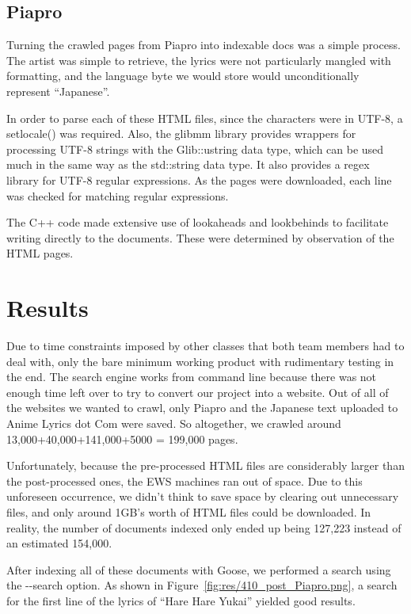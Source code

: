 \documentclass{acm} %
\begin{document}
\begin{CJK}{UTF8}{zhsong}
\subsection{Piapro}

Turning the crawled pages from Piapro into indexable docs was a simple process. The artist was simple to retrieve, the lyrics were not particularly mangled with formatting, and the language byte we would store would unconditionally represent ``Japanese''.

In order to parse each of these HTML files, since the characters were in UTF-8, a setlocale() was required. Also, the glibmm library provides wrappers for processing UTF-8 strings with the Glib::ustring data type, which can be used much in the same way as the std::string data type. It also provides a regex library for UTF-8 regular expressions. As the pages were downloaded, each line was checked for matching regular expressions.

The C++ code made extensive use of lookaheads and lookbehinds to facilitate writing directly to the documents. These were determined by observation of the HTML pages.

\section{Results}

Due to time constraints imposed by other classes that both team members had to deal with, only the bare minimum working product with rudimentary testing in the end. The search engine works from command line because there was not enough time left over to try to convert our project into a website. Out of all of the websites we wanted to crawl, only Piapro and the Japanese text uploaded to Anime Lyrics dot Com were saved. So altogether, we crawled around 13,000+40,000+141,000+5000 = 199,000 pages.

Unfortunately, because the pre-processed HTML files are considerably larger than the post-processed ones, the EWS machines ran out of space. Due to this unforeseen occurrence, we didn't think to save space by clearing out unnecessary files, and only around 1GB's worth of HTML files could be downloaded. In reality, the number of documents indexed only ended up being 127,223 instead of an estimated 154,000.

After indexing all of these documents with Goose, we performed a search using the -{}-search option. As shown in Figure~\ref{fig:res/410_post_Piapro.png}, a search for the first line of the lyrics of ``Hare Hare Yukai'' yielded good results.


\end{CJK}
\end{document}
